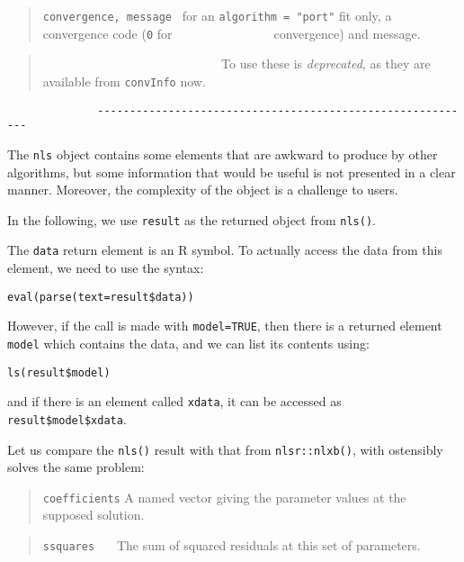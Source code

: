 \documentclass[
]{article}
\begin{document}
\begin{quote}
\texttt{convergence,\ message} ~for an \texttt{algorithm\ =\ "port"} fit
only, a convergence code (\texttt{0} for \newline
\(~~~~~~~~~~~~~~~~~~~~~~~~~~~~~~~~~~~\)convergence) and message.
\end{quote}

\begin{quote}
~ ~ ~ ~ ~ ~ ~ ~ ~ ~ ~ ~ ~ ~ ~ ~ ~ To use these is \emph{deprecated}, as
they are available from \texttt{convInfo} now.
\end{quote}

\begin{verbatim}
              -----------------------------------------------------------
\end{verbatim}

The \texttt{nls} object contains some elements that are awkward to
produce by other algorithms, but some information that would be useful
is not presented in a clear manner. Moreover, the complexity of the
object is a challenge to users.

In the following, we use \texttt{result} as the returned object from
\texttt{nls()}.

The \texttt{data} return element is an R symbol. To actually access the
data from this element, we need to use the syntax:

\begin{verbatim}
eval(parse(text=result$data))
\end{verbatim}

However, if the call is made with \texttt{model=TRUE}, then there is a
returned element \texttt{model} which contains the data, and we can list
its contents using:

\begin{verbatim}
ls(result$model)
\end{verbatim}

and if there is an element called \texttt{xdata}, it can be accessed as
\texttt{result\$model\$xdata}.

Let us compare the \texttt{nls()} result with that from
\texttt{nlsr::nlxb()}, with ostensibly solves the same problem:

\begin{quote}
\texttt{coefficients} A named vector giving the parameter values at the
supposed solution.
\end{quote}

\begin{quote}
\texttt{ssquares} \(~~~~~\) The sum of squared residuals at this set of
parameters.
\end{quote}
\end{document}
